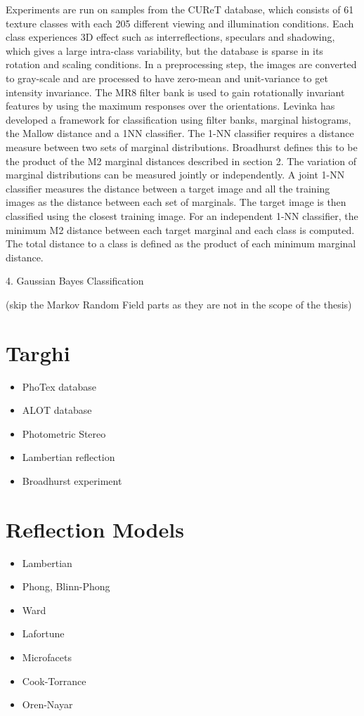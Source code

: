 Experiments are run on samples from the CUReT database, which consists of 61 texture classes with each 205 different viewing and illumination conditions. Each class experiences 3D effect such as interreflections, speculars and shadowing, which gives a large intra-class variability, but the database is sparse in its rotation and scaling conditions. In a preprocessing step, the images are converted to gray-scale and are processed to have zero-mean and unit-variance to get intensity invariance. The MR8 filter bank is used to gain rotationally invariant features by using the maximum responses over the orientations.
Levinka has developed a framework for classification using filter banks, marginal histograms, the Mallow distance and a 1NN classifier. The 1-NN classifier requires a distance measure between two sets of marginal distributions. Broadhurst defines this to be the product of the M2 marginal distances described in section 2. The variation of marginal distributions can be measured jointly or independently. A joint 1-NN classifier measures the distance between a target image and all the training images as the distance between each set of marginals. The target image is then classified using the closest training image. For an independent 1-NN classifier, the minimum M2 distance between each target marginal and each class is computed. The total distance to a class is defined as the product of each minimum marginal distance.



4. Gaussian Bayes Classification

(skip the Markov Random Field parts as they are not in the scope of the thesis)

\section{Targhi}\label{Targhi}
\begin{itemize}
	\item{PhoTex database}
	\item{ALOT database}
	\item{Photometric Stereo}
	\item{Lambertian reflection}
	\item{Broadhurst experiment}
\end{itemize}

\section{Reflection Models}
\begin{itemize}
	\item{Lambertian}
	\item{Phong, Blinn-Phong}
	\item{Ward}
	\item{Lafortune}
	\item{Microfacets}
	\item{Cook-Torrance}
	\item{Oren-Nayar}
\end{itemize}
